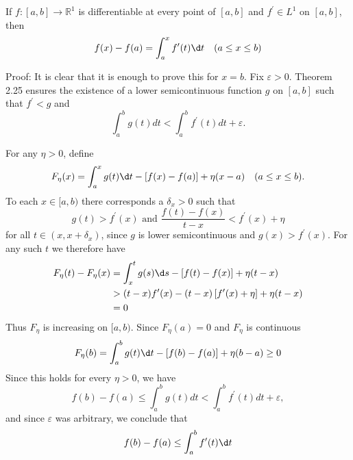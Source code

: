 \documentclass[12pt, a4paper, oneside]{book}
\begin{document}
\begin{theorem}
    If $f:[a, b] \rightarrow \mathbb{R}^1$ is differentiable at every point of $[a, b]$ and $f^{\prime} \in L^1$ on $[a, b]$, then
    \begin{equation*}
        f(x)-f(a)=\int_a^x f^{\prime}(t) \d t \quad(a \leq x \leq b)
    \end{equation*}

    Proof:
    It is clear that it is enough to prove this for $x=b$. Fix $\varepsilon>0$. Theorem 2.25 ensures the existence of a lower semicontinuous function $g$ on $[a, b]$ such that $f^{\prime} < g$ and
    \begin{equation*}
        \int_a^b g(t) d t<\int_a^b f^{\prime}(t) d t+\varepsilon .
    \end{equation*}

    For any $\eta>0$, define
    \begin{equation*}
        F_\eta(x)
        =
        \int_a^x g(t) \d t
        -
        \left[f(x)-f(a)\right]
        +
        \eta(x-a) \quad(a \leq x \leq b) .
    \end{equation*}
    To each $x \in[a, b)$ there corresponds a $\delta_x>0$ such that
    \begin{equation*}
        g(t)>f^{\prime}(x) \text { and } \frac{f(t)-f(x)}{t-x}<f^{\prime}(x)+\eta
    \end{equation*}
    for all $t \in\left(x, x+\delta_x\right)$, since $g$ is lower semicontinuous and $g(x)>f^{\prime}(x)$.
    For any such $t$ we therefore have
    \begin{equation*}
        \begin{aligned}
            F_\eta(t)-F_\eta(x) & =\int_x^t g(s) \d s-[f(t)-f(x)]+\eta(t-x)                           \\
                                & >(t-x) f^{\prime}(x)-(t-x)\left[f^{\prime}(x)+\eta\right]+\eta(t-x) \\
                                & =0
        \end{aligned}
    \end{equation*}
    Thus $F_\eta$ is increasing on $[a,b)$. Since $F_\eta(a)=0$ and $F_\eta$ is continuous
    \begin{equation*}
        F_\eta(b)
        =
        \int_a^b g(t) \d t
        -
        \left[f(b)-f(a)\right]
        +
        \eta(b-a)
        \geq 0
    \end{equation*}
    Since this holds for every $\eta>0$, we have
    \begin{equation*}
        f(b)-f(a) \leq \int_a^b g(t) d t<\int_a^b f^{\prime}(t) d t+\varepsilon,
    \end{equation*}
    and since $\varepsilon$ was arbitrary, we conclude that
    \begin{equation*}
        f(b)-f(a) \leq \int_a^b f^{\prime}(t) \d t
    \end{equation*}


\end{theorem}
\end{document}
